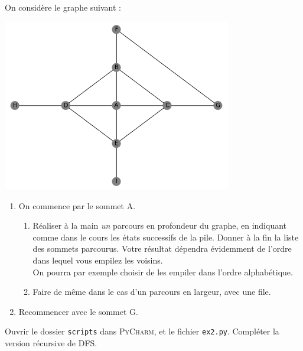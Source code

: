 \documentclass[a4paper,12pt,french]{book}
\begin{document}

\begin{exercice}
On considère le graphe suivant :
\begin{center}
\includegraphics[width=10cm]{img/00.png}
\end{center}
\begin{enumerate}
	\item On commence par le sommet A.
    \begin{enumerate}[\bfseries a.]
    	\item Réaliser à la main \textit{un} parcours en profondeur du graphe, en indiquant comme dans le cours les états successifs de la pile. Donner à la fin la liste des sommets parcourus. Votre résultat dépendra évidemment de l'ordre dans lequel vous empilez les voisins.\\
        On pourra par exemple choisir de les empiler dans l'ordre alphabétique.
        \item Faire de même dans le cas d'un parcours en largeur, avec une file.
    \end{enumerate}
    \item Recommencer avec le sommet G.
\end{enumerate}
\end{exercice}

\begin{exercice}
Ouvrir le dossier \texttt{scripts} dans \textsc{PyCharm}, et le fichier \texttt{ex2.py}. Compléter la version récursive de DFS.
\end{exercice}
\end{document}
